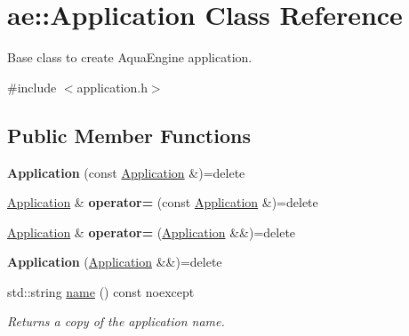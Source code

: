 \hypertarget{classae_1_1_application}{}\section{ae\+:\+:Application Class Reference}
\label{classae_1_1_application}


Base class to create Aqua\+Engine application.  




{\ttfamily \#include $<$application.\+h$>$}

\subsection*{Public Member Functions}
\begin{DoxyCompactItemize}
\item 
\hypertarget{classae_1_1_application_a7e9a30ce07057f5f37b02500f876436a}{}\label{classae_1_1_application_a7e9a30ce07057f5f37b02500f876436a} 
{\bfseries Application} (const \hyperlink{classae_1_1_application}{Application} \&)=delete
\item 
\hypertarget{classae_1_1_application_ae18f573dfd5d579e562784781f53a87a}{}\label{classae_1_1_application_ae18f573dfd5d579e562784781f53a87a} 
\hyperlink{classae_1_1_application}{Application} \& {\bfseries operator=} (const \hyperlink{classae_1_1_application}{Application} \&)=delete
\item 
\hypertarget{classae_1_1_application_ac5803ae7a946ba88cb65a110c9ae6621}{}\label{classae_1_1_application_ac5803ae7a946ba88cb65a110c9ae6621} 
\hyperlink{classae_1_1_application}{Application} \& {\bfseries operator=} (\hyperlink{classae_1_1_application}{Application} \&\&)=delete
\item 
\hypertarget{classae_1_1_application_a4c0b8e813b5596a08ecf5f69423fda99}{}\label{classae_1_1_application_a4c0b8e813b5596a08ecf5f69423fda99} 
{\bfseries Application} (\hyperlink{classae_1_1_application}{Application} \&\&)=delete
\item 
\hypertarget{classae_1_1_application_a2f4107e93f0e3c2525ad65f70a951fed}{}\label{classae_1_1_application_a2f4107e93f0e3c2525ad65f70a951fed} 
std\+::string \hyperlink{classae_1_1_application_a2f4107e93f0e3c2525ad65f70a951fed}{name} () const noexcept
\begin{DoxyCompactList}\small\item\em Returns a copy of the application name. \end{DoxyCompactList}\item 

\end{DoxyCompactItemize}
